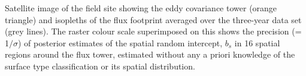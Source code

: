 \label{fig:precision_map} Satellite image of the field site
showing the eddy covariance tower (orange triangle) and isopleths of the
flux footprint averaged over the three-year data set (grey lines). The
raster colour scale superimposed on this shows the precision (=
1\(/ \sigma\)) of posterior estimates of the spatial random intercept,
\(b_{s}\) in 16 spatial regions around the flux tower, estimated without
any a priori knowledge of the surface type classification or its spatial
distribution.